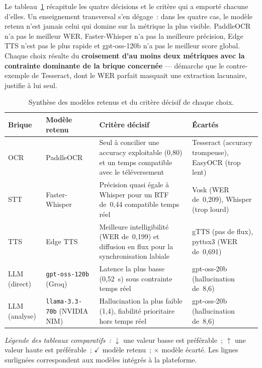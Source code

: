 Le tableau~\ref{tab:bench-summary} récapitule les quatre décisions et le critère qui a emporté
chacune d'elles. Un enseignement transversal s'en dégage~: dans les quatre cas, le modèle retenu
n'est jamais celui qui domine sur la métrique la plus visible. PaddleOCR n'a pas le meilleur WER,
Faster-Whisper n'a pas la meilleure précision, Edge TTS n'est pas le plus rapide et gpt-oss-120b
n'a pas le meilleur score global. Chaque choix résulte du \textbf{croisement d'au moins deux
métriques avec la contrainte dominante de la brique concernée} --- démarche que le contre-exemple
de Tesseract, dont le WER parfait masquait une extraction lacunaire, justifie à lui seul.

\begin{table}[H]
  \centering
  \footnotesize
  \renewcommand{\arraystretch}{1.3}
  \setlength{\tabcolsep}{5pt}
  \begin{tabularx}{\textwidth}{|>{\raggedright\arraybackslash}p{1.5cm}|>{\raggedright\arraybackslash}p{2.9cm}|>{\raggedright\arraybackslash}X|>{\raggedright\arraybackslash}p{3.0cm}|}
    \hline
    \rowcolor{blue!10}
    \textbf{Brique} & \textbf{Modèle retenu} & \textbf{Critère décisif} & \textbf{Écartés} \\
    \hline
    OCR & PaddleOCR & Seul à concilier une accuracy exploitable (0,80) et un temps compatible avec le téléversement & Tesseract (accuracy trompeuse), EasyOCR (trop lent) \\ \hline
    STT & Faster-Whisper & Précision quasi égale à Whisper pour un RTF de~0,44 compatible temps réel & Vosk (WER de~0,209), Whisper (trop lourd) \\ \hline
    TTS & Edge TTS & Meilleure intelligibilité (WER de~0,199) et diffusion en flux pour la synchronisation labiale & gTTS (pas de flux), pyttsx3 (WER de~0,691) \\ \hline
    LLM (direct) & \texttt{gpt-oss-120b} (Groq) & Latence la plus basse (0,52~s) sous contrainte temps réel & gpt-oss-20b (hallucination de~8,6) \\ \hline
    LLM (analyse) & \texttt{llama-3.3-70b} (NVIDIA NIM) & Hallucination la plus faible (1,4), fiabilité prioritaire hors temps réel & gpt-oss-20b (hallucination de~8,6) \\ \hline
  \end{tabularx}
  \caption{Synthèse des modèles retenus et du critère décisif de chaque choix.}
  \label{tab:bench-summary}
\end{table}

\noindent\textit{Légende des tableaux comparatifs~:} $\downarrow$ une valeur basse est préférable~;
$\uparrow$ une valeur haute est préférable~; $\checkmark$ modèle retenu~; $\times$ modèle écarté.
Les lignes surlignées correspondent aux modèles intégrés à la plateforme.

